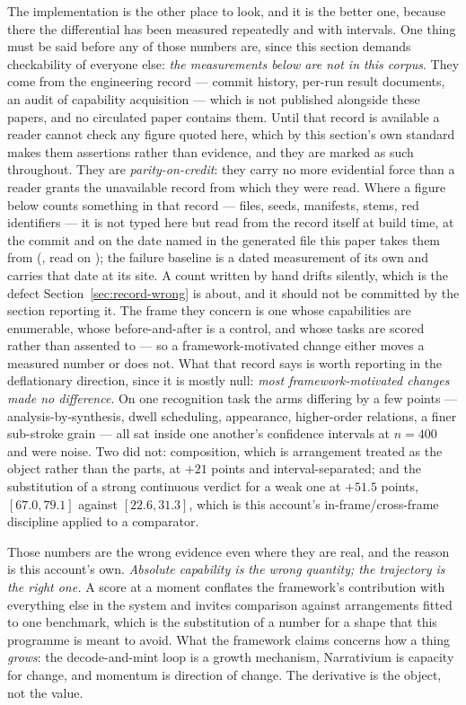 \documentclass[11pt,a4paper]{article}
\begin{document}
The implementation is the other place to look, and it is the better one, because there the differential
has been measured repeatedly and with intervals. One thing must be said before any of those numbers
are, since this section demands checkability of everyone else: \emph{the measurements below are not in
this corpus}. They come from the engineering record --- commit history, per-run result documents, an
audit of capability acquisition --- which is not published alongside these papers, and no circulated
paper contains them. Until that record is available a reader
cannot check any figure quoted here, which by this section's own standard makes them assertions rather
than evidence, and they are marked as such throughout. They are \emph{parity-on-credit}: they carry no
more evidential force than a reader grants the unavailable record from which they were read. Where a
figure below counts something in that
record --- files, seeds, manifests, stems, red identifiers --- it is not typed here but read from the
record itself at build time, at the commit and on the date named in the generated file this paper
takes them from (\countsCommit, read on \countsReadOn); the failure baseline is a dated measurement
of its own and carries that date at its site. A count written by hand drifts silently, which is the
defect Section~\ref{sec:record-wrong} is about, and it should not be committed by the section
reporting it. The frame they concern is one whose capabilities
are enumerable, whose before-and-after is a control, and whose tasks are scored rather than assented
to --- so a framework-motivated change either moves a measured number or does not. What that
record says is worth reporting in the deflationary direction, since it is mostly null:
\emph{most framework-motivated changes made no difference}. On one recognition task the arms differing
by a few points --- analysis-by-synthesis, dwell scheduling, appearance, higher-order relations, a finer
sub-stroke grain --- all sat inside one another's confidence intervals at $n=400$ and were noise. Two
did not: composition, which is arrangement treated as the object rather than the parts, at $+21$
points and interval-separated; and the substitution of a strong continuous verdict for a weak one at
$+51.5$ points, $[67.0, 79.1]$ against $[22.6, 31.3]$, which is this account's in-frame/cross-frame
discipline applied to a comparator.

Those numbers are the wrong evidence even where they are real, and the reason is this account's own.
\emph{Absolute capability is the wrong quantity; the trajectory is the right one.} A score at a moment
conflates the framework's contribution with everything else in the system and invites comparison
against arrangements fitted to one benchmark, which is the substitution of a number for a shape that
this programme is meant to avoid. What the framework claims concerns how a thing \emph{grows}: the
decode-and-mint loop is a growth mechanism, Narrativium is capacity for change, and momentum is
direction of change. The derivative is the object, not the value.
\end{document}
